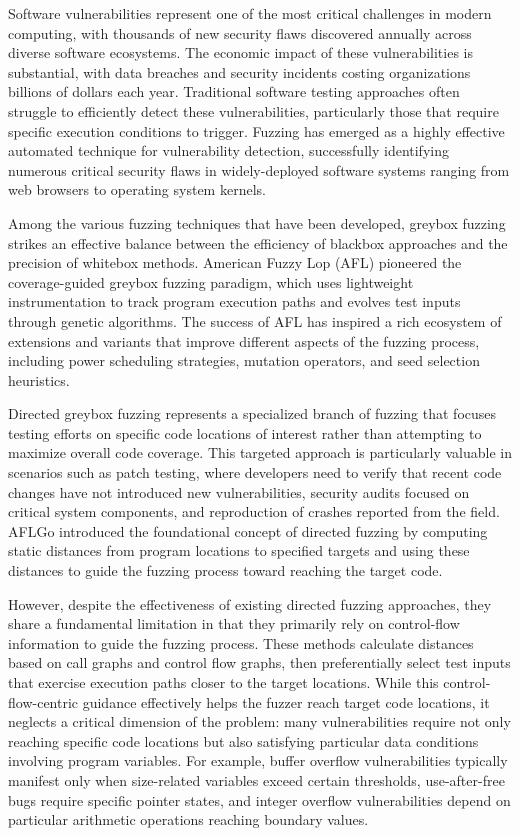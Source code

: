 \documentclass[review]{elsarticle}
\begin{document}
Software vulnerabilities represent one of the most critical challenges in modern computing, with thousands of new security flaws discovered annually across diverse software ecosystems. The economic impact of these vulnerabilities is substantial, with data breaches and security incidents costing organizations billions of dollars each year. Traditional software testing approaches often struggle to efficiently detect these vulnerabilities, particularly those that require specific execution conditions to trigger. Fuzzing has emerged as a highly effective automated technique for vulnerability detection, successfully identifying numerous critical security flaws in widely-deployed software systems ranging from web browsers to operating system kernels.

Among the various fuzzing techniques that have been developed, greybox fuzzing strikes an effective balance between the efficiency of blackbox approaches and the precision of whitebox methods. American Fuzzy Lop (AFL) pioneered the coverage-guided greybox fuzzing paradigm, which uses lightweight instrumentation to track program execution paths and evolves test inputs through genetic algorithms. The success of AFL has inspired a rich ecosystem of extensions and variants that improve different aspects of the fuzzing process, including power scheduling strategies, mutation operators, and seed selection heuristics.

Directed greybox fuzzing represents a specialized branch of fuzzing that focuses testing efforts on specific code locations of interest rather than attempting to maximize overall code coverage. This targeted approach is particularly valuable in scenarios such as patch testing, where developers need to verify that recent code changes have not introduced new vulnerabilities, security audits focused on critical system components, and reproduction of crashes reported from the field. AFLGo introduced the foundational concept of directed fuzzing by computing static distances from program locations to specified targets and using these distances to guide the fuzzing process toward reaching the target code.

However, despite the effectiveness of existing directed fuzzing approaches, they share a fundamental limitation in that they primarily rely on control-flow information to guide the fuzzing process. These methods calculate distances based on call graphs and control flow graphs, then preferentially select test inputs that exercise execution paths closer to the target locations. While this control-flow-centric guidance effectively helps the fuzzer reach target code locations, it neglects a critical dimension of the problem: many vulnerabilities require not only reaching specific code locations but also satisfying particular data conditions involving program variables. For example, buffer overflow vulnerabilities typically manifest only when size-related variables exceed certain thresholds, use-after-free bugs require specific pointer states, and integer overflow vulnerabilities depend on particular arithmetic operations reaching boundary values.
\end{document}
